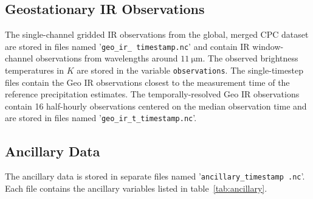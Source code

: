 \documentclass[11pt]{article}
\begin{document}
\subsection{Geostationary IR Observations}

The single-channel gridded IR observations from the global, merged CPC dataset
\citep{NCEP_CPC_L3_IR} are stored in files named '\texttt{geo\_ir\_\textlangle
	timestamp\textrangle.nc}' and contain IR window-channel observations from
wavelengths around $\SI{11}{\micro \meter}$. The observed brightness
temperatures in $\si{K}$ are stored in the variable \texttt{observations}. The
single-timestep files contain the Geo IR observations closest to the
measurement time of the reference precipitation estimates. The
temporally-resolved Geo IR observations contain 16 half-hourly observations
centered on the median observation time and are stored in files named
'\texttt{geo\_ir\_t\_\textlangle timestamp\textrangle.nc}'.

\subsection{Ancillary Data}

The ancillary data is stored in separate files named
'\texttt{ancillary\_\textlangle timestamp \textrangle.nc}'. Each file contains
the ancillary variables listed in table~\ref{tab:ancillary}.
\end{document}
